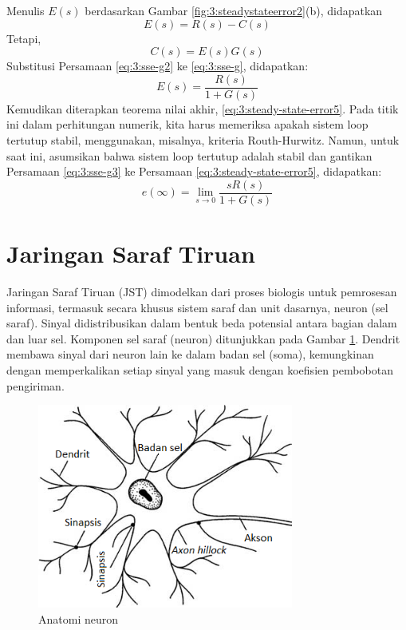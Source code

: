 Menulis $E(s)$ berdasarkan Gambar \ref{fig:3:steadystateerror2}(b), didapatkan
\begin{equation} \label{eq:3:sse-g}
E(s) = R(s) - C(s)
\end{equation}
Tetapi,
\begin{equation} \label{eq:3:sse-g2}
C(s) = E(s)G(s)
\end{equation}
Substitusi Persamaan \ref{eq:3:sse-g2} ke \ref{eq:3:sse-g}, didapatkan:
\begin{equation} \label{eq:3:sse-g3}
E(s) = \frac{ R(s) }{ 1 + G(s) }
\end{equation}
Kemudikan diterapkan teorema nilai akhir, \ref{eq:3:steady-state-error5}. Pada titik ini dalam perhitungan numerik, kita harus memeriksa apakah sistem loop tertutup stabil, menggunakan, misalnya, kriteria Routh-Hurwitz. Namun, untuk saat ini, asumsikan bahwa sistem loop tertutup adalah stabil dan gantikan Persamaan \ref{eq:3:sse-g3} ke Persamaan \ref{eq:3:steady-state-error5}, didapatkan:
\begin{equation} \label{eq:3:sse-g4}
e(\infty) = \lim_{s \to 0} \frac{ sR(s) }{ 1 + G(s) }
\end{equation}


\section{Jaringan Saraf Tiruan}
Jaringan Saraf Tiruan (JST) dimodelkan dari proses biologis untuk pemrosesan informasi, termasuk secara khusus sistem saraf dan unit dasarnya, neuron (sel saraf). Sinyal didistribusikan dalam bentuk beda potensial antara bagian dalam dan luar sel. Komponen sel saraf (neuron) ditunjukkan pada Gambar \ref{fig:3:neuron}. Dendrit membawa sinyal dari neuron lain ke dalam badan sel (soma), kemungkinan dengan memperkalikan setiap sinyal yang masuk dengan koefisien pembobotan pengiriman.

\begin{figure}[!h]
	\centering
	\includegraphics[width=0.75\textwidth]{figures/neuron}
	\caption{Anatomi neuron}
	\label{fig:3:neuron}
\end{figure}

